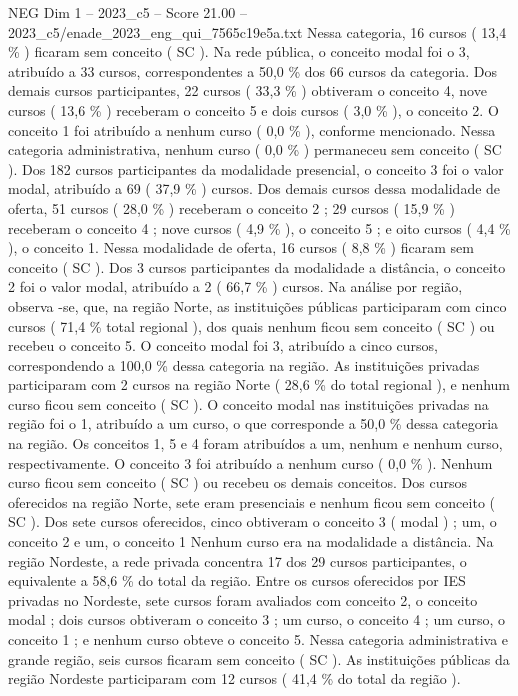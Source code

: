 \begin{textsample}{NEG Dim 1 – 2023\_c5 – Score 21.00 – 2023\_c5/enade\_2023\_eng\_qui\_7565c19e5a.txt}
Nessa categoria, 16 cursos ( 13,4 \% ) ficaram sem conceito ( SC ).
Na rede pública, o conceito modal foi o 3, atribuído a 33 cursos, correspondentes a 50,0 \% dos 66 cursos da categoria.
Dos demais cursos participantes, 22 cursos ( 33,3 \% ) obtiveram o conceito 4, nove cursos ( 13,6 \% ) receberam o conceito 5 e dois cursos ( 3,0 \% ), o conceito 2.
O conceito 1 foi atribuído a nenhum curso ( 0,0 \% ), conforme mencionado.
Nessa categoria administrativa, nenhum curso ( 0,0 \% ) permaneceu sem conceito ( SC ).
Dos 182 cursos participantes da modalidade presencial, o conceito 3 foi o valor modal, atribuído a 69 ( 37,9 \% ) cursos.
Dos demais cursos dessa modalidade de oferta, 51 cursos ( 28,0 \% ) receberam o conceito 2 ; 29 cursos ( 15,9 \% ) receberam o conceito 4 ; nove cursos ( 4,9 \% ), o conceito 5 ; e oito cursos ( 4,4 \% ), o conceito 1.
Nessa modalidade de oferta, 16 cursos ( 8,8 \% ) ficaram sem conceito ( SC ).
Dos 3 cursos participantes da modalidade a distância, o conceito 2 foi o valor modal, atribuído a 2 ( 66,7 \% ) cursos.
Na análise por região, observa -se, que, na região Norte, as instituições públicas participaram com cinco cursos ( 71,4 \% total regional ), dos quais nenhum ficou sem conceito ( SC ) ou recebeu o conceito 5.
O conceito modal foi 3, atribuído a cinco cursos, correspondendo a 100,0 \% dessa categoria na região.
As instituições privadas participaram com 2 cursos na região Norte ( 28,6 \% do total regional ), e nenhum curso ficou sem conceito ( SC ).
O conceito modal nas instituições privadas na região foi o 1, atribuído a um curso, o que corresponde a 50,0 \% dessa categoria na região.
Os conceitos 1, 5 e 4 foram atribuídos a um, nenhum e nenhum curso, respectivamente.
O conceito 3 foi atribuído a nenhum curso ( 0,0 \% ).
Nenhum curso ficou sem conceito ( SC ) ou recebeu os demais conceitos.
Dos cursos oferecidos na região Norte, sete eram presenciais e nenhum ficou sem conceito ( SC ).
Dos sete cursos oferecidos, cinco obtiveram o conceito 3 ( modal ) ; um, o conceito 2 e um, o conceito 1 Nenhum curso era na modalidade a distância.
Na região Nordeste, a rede privada concentra 17 dos 29 cursos participantes, o equivalente a 58,6 \% do total da região.
Entre os cursos oferecidos por IES privadas no Nordeste, sete cursos foram avaliados com conceito 2, o conceito modal ; dois cursos obtiveram o conceito 3 ; um curso, o conceito 4 ; um curso, o conceito 1 ; e nenhum curso obteve o conceito 5.
Nessa categoria administrativa e grande região, seis cursos ficaram sem conceito ( SC ).
As instituições públicas da região Nordeste participaram com 12 cursos ( 41,4 \% do total da região ).

\end{textsample}
